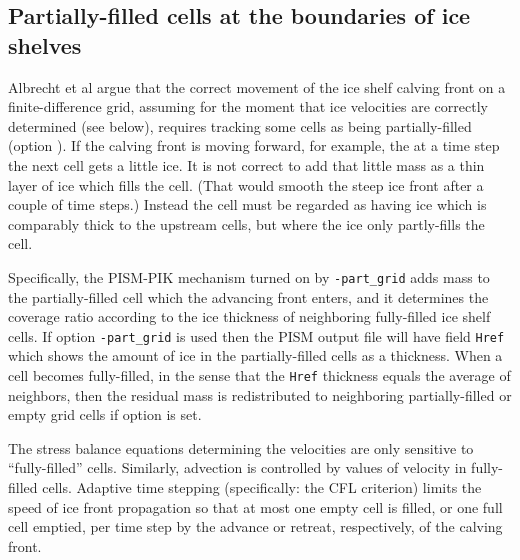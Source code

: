 \subsection{Partially-filled cells at the boundaries of ice shelves}
\label{sec:part-grid}
Albrecht et al \cite{Albrechtetal2011} argue that the correct movement of the ice shelf calving front on a finite-difference grid, assuming for the moment that ice velocities are correctly determined (see below), requires tracking some cells as being partially-filled (option ).  If the calving front is moving forward, for example, the at a time step the next cell gets a little ice.  It is not correct to add that little mass as a thin layer of ice which fills the cell.  (That would smooth the steep ice front after a couple of time steps.)  Instead the cell must be regarded as having ice which is comparably thick to the upstream cells, but where the ice only partly-fills the cell.

Specifically, the PISM-PIK mechanism turned on by \texttt{-part_grid} adds mass to the partially-filled cell which the advancing front enters, and it determines the coverage ratio according to the ice thickness of neighboring fully-filled ice shelf cells.  If option \texttt{-part_grid} is used then the PISM output file will have field \texttt{Href} which shows the amount of ice in the partially-filled cells as a thickness.  When a cell becomes fully-filled, in the sense that the \texttt{Href} thickness equals the average of neighbors, then the residual mass is redistributed to neighboring partially-filled or empty grid cells if option  is set.

The stress balance equations determining the velocities are only sensitive to ``fully-filled'' cells.  Similarly, advection is controlled by values of velocity in fully-filled cells.  Adaptive time stepping (specifically: the CFL criterion) limits the speed of ice front propagation so that at most one empty cell is filled, or one full cell emptied, per time step by the advance or retreat, respectively, of the calving front.

